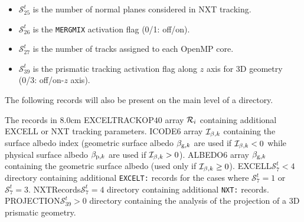 \begin{itemize}
\item $\mathcal{S}^{t}_{25}$ is the number of normal planes considered in NXT tracking.

\item $\mathcal{S}^{t}_{26}$ is the {\tt MERGMIX} activation flag (0/1: off/on).

\item $\mathcal{S}^{t}_{27}$ is the number of tracks assigned to each OpenMP core.

\item $\mathcal{S}^{t}_{39}$ is the prismatic tracking activation flag along $z$ axis for 3D geometry (0/3: off/on-$z$ axis).

\end{itemize}

The following records will also be present on the main level of a 
directory.

\begin{DescriptionEnregistrement}{The  records in }{8.0cm}
\RealEnr
  {EXCELTRACKOP}{$40$}{}
  {array ${\cal R}_i$ containing additional EXCELL or NXT tracking parameters.} 
\IntEnr
  {ICODE}{$6$}
  {array ${\cal I}_{\beta,k}$ containing the surface albedo index (geometric surface albedo
  $\beta_{{\rm g},k}$ are used if ${\cal I}_{\beta,k}< 0$ while physical 
  surface albedo $\beta_{{\rm p},k}$ are used if ${\cal I}_{\beta,k}> 0$).} 
\RealEnr
  {ALBEDO}{$6$}{}
  {array $\beta_{{\rm g},k}$ containing the geometric surface albedo (used only if ${\cal I}_{\beta,k}\ge 0$).}
\OptDirEnr
  {EXCELL}{$\mathcal{S}^{t}_{7}< 4$}
  {directory containing additional {\tt EXCELT:}  records for the cases where $\mathcal{S}^{t}_{7}=1$ or $\mathcal{S}^{t}_{7}=3$.}
\OptDirEnr
  {NXTRecords}{$\mathcal{S}^{t}_{7}=4$}
  {directory containing additional {\tt NXT:} records.}
\OptDirEnr
  {PROJECTION}{$\mathcal{S}^{t}_{39}>0$}
  {directory containing the analysis of the projection of a 3D prismatic geometry.}
\end{DescriptionEnregistrement}

